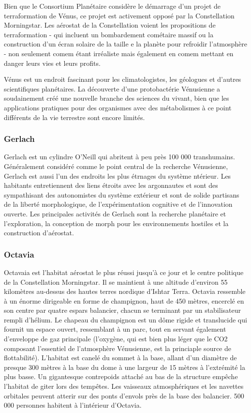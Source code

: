 Bien que le Consortium Planétaire considère le démarrage d'un projet de terraformation de Vénus, ce projet est activement opposé par la Constellation Morningstar. Les aérostat de la Constellation voient les propositions de terraformation - qui incluent un bombardement cométaire massif ou la construction d'un écran solaire de la taille e la planète pour refroidir l'atmosphère - non seulement comem étant irréaliste mais également en comem mettant en danger leurs vies et leurs profits. 

Vénus est un endroit fascinant pour les climatologistes, les géologues et d'autres scientifiques planétaires. La découverte d'une protobactérie Vénusienne a soudainement créé une nouvelle branche des sciences du vivant, bien que les applications pratiques pour des organismes avec des métabolismes à ce point différents de la vie terrestre sont encore limités. 

\subsubsection{Gerlach} \label{sec:gerlach} 

Gerlach est un cylindre O'Neill qui abritent à peu près 100 000 transhumains. Généralement considéré comme le point central de la recherche Vénusienne, Gerlach est aussi l'un des endroits les plus étrnages du système ntérieur. Les habitants entretiennent des liens étroits avec les argonnautes et sont des sympathisant des autonomistes du système extérieur et sont de solide partisans de la liberté morphologique, de l'expérimentation cognitive et de l'innovation ouverte. Les principales activités de Gerlach sont la recherche planétaire et l'exploration, la conception de morph pour les environnements hostiles et la construction d'aérostat. 

\subsubsection{Octavia} \label{sec:octavia} 

Octavaia est l'habitat aérostat le plus réussi jusqu'à ce jour et le centre politique de la Constellation Morningstar. Il se maintient à une altitude d'environ 55 kilomètres au-dessus des hautes terres nordique d'Ishtar Terra. Octavia ressemble à un énorme dirigeable en forme de champignon, haut de 450 mètres, encerclé en son centre par quatre espars balancier, chacun se terminant par un stabilisateur rempli d'hélium. Le chapeau du champignon est un dôme rigide et translucide qui fournit un espace ouvert, ressemblant à un parc, tout en servant également d'enveloppe de gaz principale (l'oxygène, qui est bien plus léger que le CO2 composant l'essentiel de l'atmosphère Vénusienne, est la princiaple source de flottabilité). L'habitat est canelé du sommet à la base, allant d'un diamètre de presque 300 mètres à la base du dome à une largeur de 15 mètres à l'extrémité la plus basse. Un gigantesque contrepoids attaché au bas de la structure empêche l'habitat de giter lors des tempêtes. Les vaisseaux atmosphériques et les navettes orbitales peuvent atterir sur des ponts d'envols près de la base des balancier. 500 000 personnes habitent à l'intérieur d'Octavia. 

